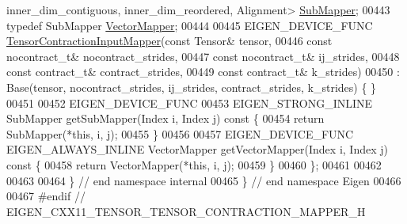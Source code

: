 \begin{DoxyCode}
{       inner\_dim\_contiguous, inner\_dim\_reordered, Alignment>}
       \hyperlink{class_eigen_1_1internal_1_1_tensor_contraction_sub_mapper}{SubMapper};
00443   \textcolor{keyword}{typedef} SubMapper \hyperlink{class_eigen_1_1internal_1_1_tensor_contraction_sub_mapper}{VectorMapper};
00444 
00445   EIGEN\_DEVICE\_FUNC \hyperlink{class_eigen_1_1internal_1_1_tensor_contraction_input_mapper}{TensorContractionInputMapper}(\textcolor{keyword}{const} Tensor& tensor,
00446                                \textcolor{keyword}{const} nocontract\_t& nocontract\_strides,
00447                                \textcolor{keyword}{const} nocontract\_t& ij\_strides,
00448                                \textcolor{keyword}{const} contract\_t& contract\_strides,
00449                                \textcolor{keyword}{const} contract\_t& k\_strides)
00450       : Base(tensor, nocontract\_strides, ij\_strides, contract\_strides, k\_strides) \{ \}
00451 
00452   EIGEN\_DEVICE\_FUNC
00453   EIGEN\_STRONG\_INLINE SubMapper getSubMapper(Index i, Index j)\textcolor{keyword}{ const }\{
00454     \textcolor{keywordflow}{return} SubMapper(*\textcolor{keyword}{this}, i, j);
00455   \}
00456 
00457   EIGEN\_DEVICE\_FUNC EIGEN\_ALWAYS\_INLINE VectorMapper getVectorMapper(Index i, Index j)\textcolor{keyword}{ const }\{
00458     \textcolor{keywordflow}{return} VectorMapper(*\textcolor{keyword}{this}, i, j);
00459   \}
00460 \};
00461 
00462 
00463 
00464 \}  \textcolor{comment}{// end namespace internal}
00465 \}  \textcolor{comment}{// end namespace Eigen}
00466 
00467 \textcolor{preprocessor}{#endif // EIGEN\_CXX11\_TENSOR\_TENSOR\_CONTRACTION\_MAPPER\_H}
\end{DoxyCode}
